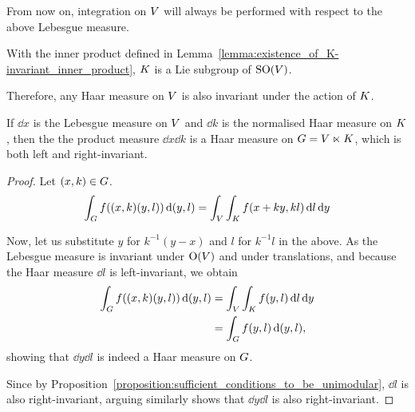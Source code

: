 From now on, integration on $V$ will always be performed with respect to the above Lebesgue measure.

\begin{lemma}
\label{lemma:K_subset_of_SO_and_invariance_of_the_induced_Lebesgue_measure}
    With the inner product defined in Lemma~\ref{lemma:existence_of_K-invariant_inner_product},
    $K$ is a Lie subgroup of ${\mathrm{SO} (V)}$.

    Therefore, any Haar measure on $V$ is also invariant under the action of $K$.
\end{lemma}

\begin{lemma}
\label{lemma:Haar_measure}
    If $\dd x$ is the Lebesgue measure on $V$ and $\dd k$ is the normalised Haar measure on $K$,
    then the the product measure $\dd x \dd k$ is a Haar measure on $G = V \ltimes K$,
    which is both left and right-invariant.
\end{lemma}
\begin{proof}
    Let $(x, k) \in G$.
    \begin{align*}
        \int_G f((x, k) (y, l)) \,\mathrm{d} (y, l)
        = \int_V \int_K f(x + ky, k l) \,\mathrm{d} l \,\mathrm{d} y
    \end{align*}

    Now, let us substitute $y$ for $k^{-1}(y - x)$ and $l$ for $k^{-1} l$ in the above.
    As the Lebesgue measure is invariant under ${\mathrm{O} (V)}$ and under translations,
    and because the Haar measure $\dd l$ is left-invariant,
    we obtain
    \begin{align*}
        \int_G f((x, k) (y, l)) \,\mathrm{d} (y, l)
        &= \int_V \int_K f(y, l) \,\mathrm{d} l \,\mathrm{d} y\\
        &= \int_G f(y, l) \,\mathrm{d} (y, l),
    \end{align*}
    showing that $\dd y \dd l$ is indeed a Haar measure on $G$.

    Since by Proposition~\ref{proposition:sufficient_conditions_to_be_unimodular}, $\dd l$ is also right-invariant,
    arguing similarly shows that $\dd y \dd l$ is also right-invariant.
\end{proof}

